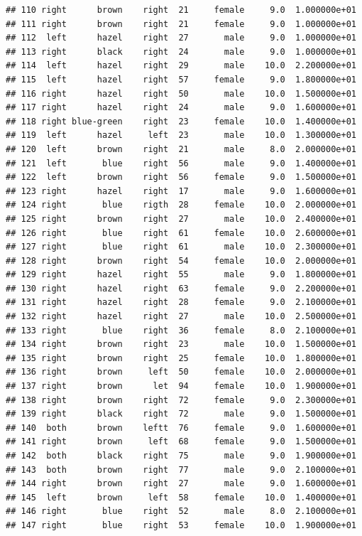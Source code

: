 \documentclass[]{article}
\begin{document}
\begin{verbatim}
## 110 right      brown    right  21     female     9.0  1.000000e+01
## 111 right      brown    right  21     female     9.0  1.000000e+01
## 112  left      hazel    right  27       male     9.0  1.000000e+01
## 113 right      black    right  24       male     9.0  1.000000e+01
## 114  left      hazel    right  29       male    10.0  2.200000e+01
## 115  left      hazel    right  57     female     9.0  1.800000e+01
## 116 right      hazel    right  50       male    10.0  1.500000e+01
## 117 right      hazel    right  24       male     9.0  1.600000e+01
## 118 right blue-green    right  23     female    10.0  1.400000e+01
## 119  left      hazel     left  23       male    10.0  1.300000e+01
## 120  left      brown    right  21       male     8.0  2.000000e+01
## 121  left       blue    right  56       male     9.0  1.400000e+01
## 122  left      brown    right  56     female     9.0  1.500000e+01
## 123 right      hazel    right  17       male     9.0  1.600000e+01
## 124 right       blue    rigth  28     female    10.0  2.000000e+01
## 125 right      brown    right  27       male    10.0  2.400000e+01
## 126 right       blue    right  61     female    10.0  2.600000e+01
## 127 right       blue    right  61       male    10.0  2.300000e+01
## 128 right      brown    right  54     female    10.0  2.000000e+01
## 129 right      hazel    right  55       male     9.0  1.800000e+01
## 130 right      hazel    right  63     female     9.0  2.200000e+01
## 131 right      hazel    right  28     female     9.0  2.100000e+01
## 132 right      hazel    right  27       male    10.0  2.500000e+01
## 133 right       blue    right  36     female     8.0  2.100000e+01
## 134 right      brown    right  23       male    10.0  1.500000e+01
## 135 right      brown    right  25     female    10.0  1.800000e+01
## 136 right      brown     left  50     female    10.0  2.000000e+01
## 137 right      brown      let  94     female    10.0  1.900000e+01
## 138 right      brown    right  72     female     9.0  2.300000e+01
## 139 right      black    right  72       male     9.0  1.500000e+01
## 140  both      brown    leftt  76     female     9.0  1.600000e+01
## 141 right      brown     left  68     female     9.0  1.500000e+01
## 142  both      black    right  75       male     9.0  1.900000e+01
## 143  both      brown    right  77       male     9.0  2.100000e+01
## 144 right      brown    right  27       male     9.0  1.600000e+01
## 145  left      brown     left  58     female    10.0  1.400000e+01
## 146 right       blue    right  52       male     8.0  2.100000e+01
## 147 right       blue    right  53     female    10.0  1.900000e+01

\end{verbatim}
\end{document}
